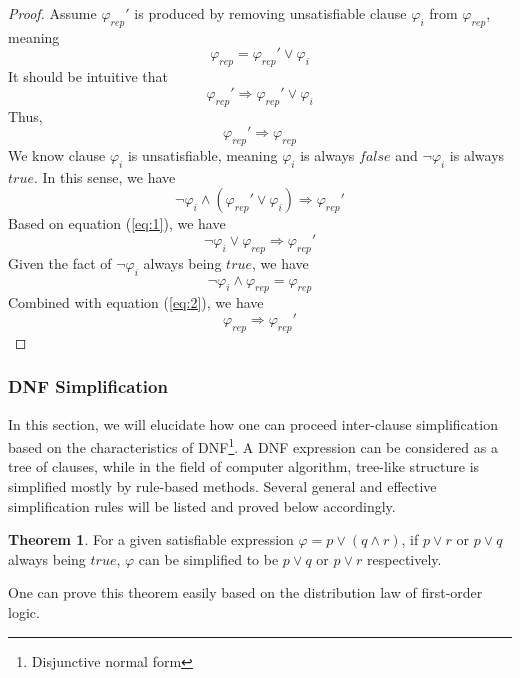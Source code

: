 \documentclass[10pt,journal,final,]{article}
\theoremstyle{definition}
\newtheorem{theorem}{Theorem}[section]
\begin{document}
\begin{proof}
Assume $\varphi _{rep}'$ is produced by removing unsatisfiable clause $\varphi _{i}$ from $\varphi _{rep}$, meaning
\begin{equation}
\label{eq:1}
\varphi _{rep} = \varphi _{rep}' \vee \varphi _{i}
\end{equation}
It should be intuitive that
\begin{equation}
\varphi _{rep}' \Longrightarrow \varphi _{rep}' \vee \varphi _{i}
\end{equation}
Thus,
\begin{equation}
\varphi _{rep}' \Longrightarrow \varphi _{rep}
\end{equation}
We know clause $\varphi _{i}$ is unsatisfiable, meaning $\varphi _{i}$ is always $false$ and $\neg \varphi _{i}$ is always $true$. In this sense, we have
\begin{equation}
\neg \varphi _{i} \wedge (\varphi _{rep}' \vee \varphi _{i}) \Longrightarrow \varphi _{rep}'
\end{equation}
Based on equation (\ref{eq:1}), we have
\begin{equation}
\label{eq:2}
\neg \varphi _{i} \vee \varphi _{rep} \Longrightarrow \varphi _{rep}'
\end{equation}
Given the fact of $\neg \varphi _{i}$ always being $true$, we have
\begin{equation}
\neg \varphi _{i} \wedge \varphi _{rep} = \varphi _{rep}
\end{equation}
Combined with equation (\ref{eq:2}), we have
\begin{equation}
\varphi _{rep} \Longrightarrow \varphi _{rep}'
\end{equation}
\end{proof}

\subsubsection{DNF Simplification}
In this section, we will elucidate how one can proceed inter-clause simplification based on the characteristics of DNF\footnote{Disjunctive normal form}.
A DNF expression can be considered as a tree of clauses, while in the field of computer algorithm, tree-like structure is simplified mostly by rule-based methods.
Several general and effective simplification rules will be listed and proved below accordingly.

\begin{theorem}
For a given satisfiable expression $\varphi = p \vee (q \wedge r)$, if $p \vee r$ or $p \vee q$ always being $true$, $\varphi$ can be simplified to be $p \vee q$ or $p \vee r$ respectively.
\end{theorem}
One can prove this theorem easily based on the distribution law of first-order logic.
\end{document}
